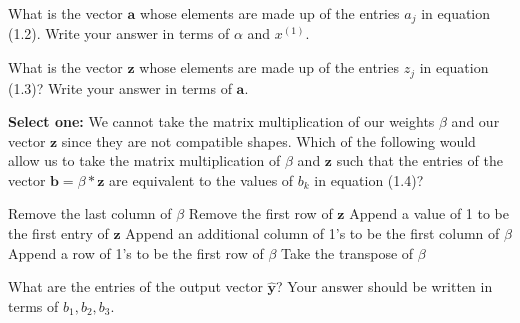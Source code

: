 \documentclass[11pt]{exam}
\numberwithin{equation}{section} %
\numberwithin{figure}{section} %
\numberwithin{table}{section} %
\newcommand{\av}{\mathbf{a}}
\newcommand{\bv}{\mathbf{b}}
\newcommand{\yv}{\mathbf{y}}
\newcommand{\zv}{\mathbf{z}}
\begin{document}
\begin{enumerate}
\begin{questions}
	        
	        
	        
	        \question[1] What is the vector $\av$ whose elements are made up of the entries $a_j$ in equation (1.2). Write your answer in terms of $\alpha$ and $x^{(1)}$.
	        
	        \begin{tcolorbox}[fit,height=1cm, width=4cm, blank, borderline={1pt}{-2pt}]
	        \end{tcolorbox}
	        
	        
	        
	        
	        \question[1] What is the vector $\zv$ whose elements are made up of the entries $z_j$ in equation (1.3)? Write your answer in terms of $\av$.
	        
	        \begin{tcolorbox}[fit,height=1cm, width=4cm, blank, borderline={1pt}{-2pt}]
	        \end{tcolorbox}
	        
	        \clearpage	        

	        \question[1] \textbf{Select one:} We cannot take the matrix multiplication of our weights $\beta$ and our vector $\zv$ since they are not compatible shapes. Which of the following would allow us to take the matrix multiplication of $\beta$ and $\zv$ such that the entries of the vector $\bv = \beta*\zv$ are equivalent to the values of $b_k$ in equation (1.4)? 
	        
	        \begin{checkboxes}{}
	        \choice Remove the last column of $\beta$
	        \choice Remove the first row of $\zv$
	        \choice Append a value of 1 to be the first entry of $\zv$
	        \choice Append an additional column of 1's to be the first column of $\beta$ 
	        \choice Append a row of 1's to be the first row of $\beta$ 
	        \choice Take the transpose of $\beta$
	        \end{checkboxes}
	        
	        
	        
	        
	        \question[1] What are the entries of the output vector $\hat{\yv}$? Your answer should be written in terms of $b_1,b_2,b_3$.
	        
	        \begin{tcolorbox}[fit,height=4cm, width=15cm, blank, borderline={1pt}{-2pt}]
	        \end{tcolorbox}
	        

\end{questions}
\end{enumerate}
\end{document}

